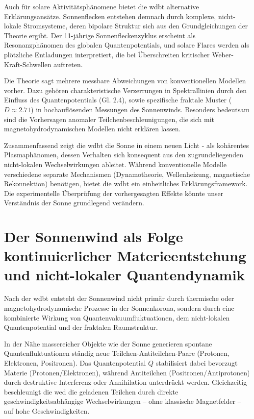 Auch für solare Aktivitätsphänomene bietet die \gls{wdbt} alternative Erklärungsansätze. Sonnenflecken entstehen demnach durch komplexe, nicht-lokale Stromsysteme, deren bipolare
Struktur sich aus den Grundgleichungen der Theorie ergibt. Der 11-jährige Sonnenfleckenzyklus erscheint als Resonanzphänomen des globalen Quantenpotentials, und solare Flares
werden als plötzliche Entladungen interpretiert, die bei Überschreiten kritischer Weber-Kraft-Schwellen auftreten.

Die Theorie sagt mehrere messbare Abweichungen von konventionellen Modellen vorher. Dazu gehören charakteristische Verzerrungen in Spektrallinien durch den Einfluss des
Quantenpotentials (Gl. 2.4), sowie spezifische fraktale Muster ($D \approx 2.71$) in hochauflösenden Messungen des Sonnenwinds. Besonders bedeutsam sind die Vorhersagen anomaler
Teilchenbeschleunigungen, die sich mit magnetohydrodynamischen Modellen nicht erklären lassen.

Zusammenfassend zeigt die \gls{wdbt} die Sonne in einem neuen Licht - als kohärentes Plasmaphänomen, dessen Verhalten sich konsequent aus den zugrundeliegenden nicht-lokalen
Wechselwirkungen ableitet. Während konventionelle Modelle verschiedene separate Mechanismen (Dynamotheorie, Wellenheizung, magnetische Rekonnektion) benötigen, bietet die \gls{wdbt}
ein einheitliches Erklärungsframework. Die experimentelle Überprüfung der vorhergesagten Effekte könnte unser Verständnis der Sonne grundlegend verändern.

\section{Der Sonnenwind als Folge kontinuierlicher Materieentstehung und nicht-lokaler Quantendynamik}
Nach der \gls{wdbt} entsteht der Sonnenwind nicht primär durch thermische oder magnetohydrodynamische Prozesse in der Sonnenkorona, sondern durch eine kombinierte Wirkung von
Quantenvakuumfluktuationen, dem nicht-lokalen Quantenpotential und der fraktalen Raumstruktur.

In der Nähe massereicher Objekte wie der Sonne generieren spontane Quantenfluktuationen ständig neue Teilchen-Antiteilchen-Paare (Protonen, Elektronen, Positronen). Das Quantenpotential $Q$ stabilisiert
dabei bevorzugt Materie (Protonen/Elektronen), während Antiteilchen (Positronen/Antiprotonen) durch destruktive Interferenz oder Annihilation unterdrückt werden. Gleichzeitig
beschleunigt die \gls{wed} die geladenen Teilchen durch direkte geschwindigkeitsabhängige Wechselwirkungen – ohne klassische Magnetfelder – auf hohe Geschwindigkeiten.

